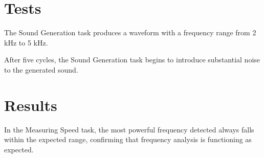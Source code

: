 \documentclass[a4paper,12pt]{article}
\begin{document}





\section{Tests}
The Sound Generation task produces a waveform with a frequency range from 2 kHz to 5 kHz.

After five cycles, the Sound Generation task begins to introduce substantial noise to the generated sound.


\section{Results}
In the Measuring Speed task, the most powerful frequency detected always falls within the expected range, confirming that frequency analysis is functioning as expected.
\end{document}

